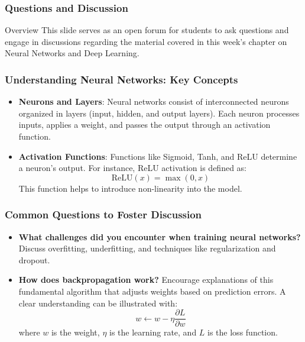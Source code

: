 \documentclass[aspectratio=169]{beamer}
\begin{document}
\begin{frame}[fragile]
    \frametitle{Questions and Discussion}
    \begin{block}{Overview}
        This slide serves as an open forum for students to ask questions and engage in discussions regarding the material covered in this week's chapter on Neural Networks and Deep Learning.
    \end{block}
\end{frame}

\begin{frame}[fragile]
    \frametitle{Understanding Neural Networks: Key Concepts}
    \begin{itemize}
        \item \textbf{Neurons and Layers}: Neural networks consist of interconnected neurons organized in layers (input, hidden, and output layers). Each neuron processes inputs, applies a weight, and passes the output through an activation function.
        \item \textbf{Activation Functions}: Functions like Sigmoid, Tanh, and ReLU determine a neuron's output. For instance, ReLU activation is defined as:
              \begin{equation}
              \text{ReLU}(x) = \max(0, x)
              \end{equation}
              This function helps to introduce non-linearity into the model.
    \end{itemize}
\end{frame}

\begin{frame}[fragile]
    \frametitle{Common Questions to Foster Discussion}
    \begin{itemize}
        \item \textbf{What challenges did you encounter when training neural networks?} Discuss overfitting, underfitting, and techniques like regularization and dropout.
        \item \textbf{How does backpropagation work?} Encourage explanations of this fundamental algorithm that adjusts weights based on prediction errors. A clear understanding can be illustrated with:
              \begin{equation}
              w \leftarrow w - \eta \frac{\partial L}{\partial w}
              \end{equation}
              where \(w\) is the weight, \(\eta\) is the learning rate, and \(L\) is the loss function.
    \end{itemize}
\end{frame}
\end{document}
